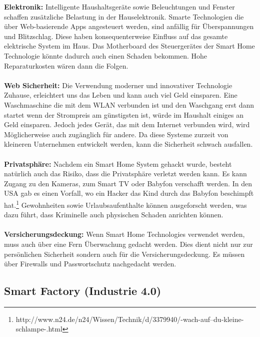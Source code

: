 \documentclass{report}
\begin{document}
\textbf{Elektronik:} Intelligente Haushaltsgeräte sowie Beleuchtungen und Fenster schaffen zusätzliche Belastung in der Hauselektronik. Smarte Technologien die über Web-basierende Apps angesteuert werden, sind anfällig für Überspannungen und Blitzschlag. Diese haben konsequenterweise Einfluss auf das gesamte elektrische System im Haus. Das Motherboard des Steuergerätes der Smart Home Technologie könnte dadurch auch einen Schaden bekommen. Hohe Reparaturkosten wären dann die Folgen.
\\
\\
\textbf{Web Sicherheit:} Die Verwendung moderner und innovativer Technologie Zuhause, erleichtert uns das Leben und kann auch viel Geld einsparen. Eine Waschmaschine die mit dem WLAN verbunden ist und den Waschgang erst dann startet wenn der Strompreis am günstigsten ist, würde im Haushalt einiges an Geld einsparen. Jedoch jedes Gerät, das mit dem Internet verbunden wird, wird Möglicherweise auch zugänglich für andere. 
Da diese Systeme zurzeit von kleineren Unternehmen entwickelt werden, kann die Sicherheit schwach ausfallen.
\\
\\
\textbf{Privatsphäre:} Nachdem ein Smart Home System gehackt wurde, besteht natürlich auch das Risiko, dass die Privatsphäre verletzt werden kann. Es kann Zugang zu den Kameras, zum Smart TV oder Babyfon verschafft werden. In den USA gab es einen Vorfall, wo ein Hacker das Kind durch das Babyfon beschimpft hat.\footnote{http://www.n24.de/n24/Wissen/Technik/d/3379940/-wach-auf--du-kleine-schlampe-.html}
Gewohnheiten sowie Urlaubsaufenthalte können ausgeforscht werden, was dazu führt, dass Kriminelle auch physischen Schaden anrichten können.
\\
\\
\textbf{Versicherungsdeckung:} Wenn Smart Home Technologies verwendet werden, muss auch über eine Fern Überwachung gedacht werden. Dies dient nicht nur zur persönlichen Sicherheit sondern auch für die Versicherungsdeckung. Es müssen über Firewalls und Passwortschutz nachgedacht werden.

\subsection{Smart Factory (Industrie 4.0)}
\end{document}

